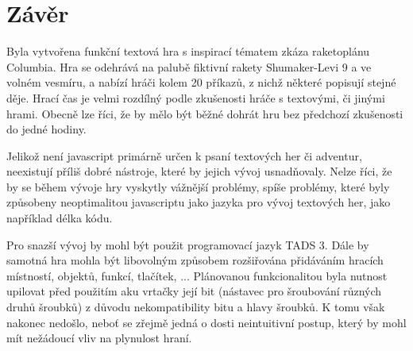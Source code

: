 \documentclass[main.tex]{subfiles}
\begin{document}
\section{Závěr} 
Byla vytvořena funkční textová hra s inspirací tématem zkáza raketoplánu Columbia. Hra se odehrává na palubě fiktivní rakety Shumaker-Levi 9 a ve volném vesmíru, a nabízí hráči kolem 20 příkazů, z nichž některé popisují stejné děje. Hrací čas je velmi rozdílný podle zkušenosti hráče s textovými, či jinými hrami. Obecně lze říci, že by mělo být běžné dohrát hru bez předchozí zkušenosti do jedné hodiny. 

Jelikož není javascript primárně určen k psaní textových her či adventur, neexistují příliš dobré nástroje, které by jejich vývoj usnadňovaly. Nelze říci, že by se během vývoje hry vyskytly vážnější problémy, spíše problémy, které byly způsobeny neoptimalitou javascriptu jako jazyka pro vývoj textových her, jako například délka kódu.

Pro snazší vývoj by mohl být použit programovací jazyk TADS 3. Dále by samotná hra mohla být libovolným způsobem rozšiřována přidáváním hracích místností, objektů, funkcí, tlačítek, ... Plánovanou funkcionalitou byla nutnost upilovat před použitím aku vrtačky její bit (nástavec pro šroubování různých druhů šroubků) z důvodu nekompatibility bitu a hlavy šroubků. K tomu však nakonec nedošlo, neboť se zřejmě jedná o dosti neintuitivní postup, který by mohl mít nežádoucí vliv na plynulost hraní. 
\end{document}
